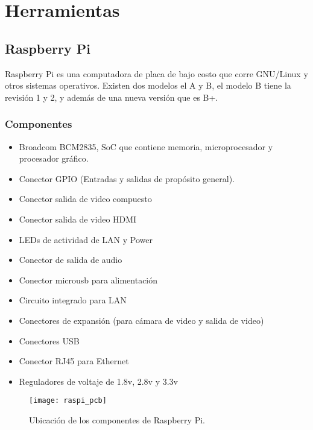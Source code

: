 \chapter{Herramientas}
\section{Raspberry Pi}

Raspberry Pi es una computadora de placa de bajo costo que corre GNU/Linux y otros sistemas operativos. Existen dos modelos el A y B, el modelo B tiene la revisión 1 y 2, y además de una nueva versión que es B+.
\subsection{Componentes}
\begin{itemize}
\item Broadcom BCM2835, SoC que contiene memoria, microprocesador y procesador gráfico.
\item Conector GPIO (Entradas y salidas de propósito general).
\item Conector salida de video compuesto
\item Conector salida de video HDMI
\item LEDs de actividad de LAN y Power
\item Conector de salida de audio
\item Conector microusb para alimentación
\item Circuito integrado para LAN
\item Conectores de expansión (para cámara de video y salida de video)
\item Conectores USB
\item Conector RJ45 para Ethernet
\item Reguladores de voltaje de 1.8v, 2.8v y 3.3v 
\end{itemize}

\begin{figure}
  \centering
    \texttt{[image: raspi\_pcb]}
  \caption{Ubicación de los componentes de Raspberry Pi. \cite{raspberry_pi_wiki}}
  \label{fig:raspi_pcb}
\end{figure}

